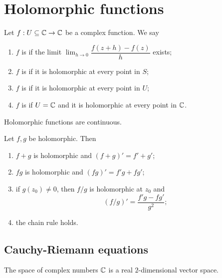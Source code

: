 \section{Holomorphic functions}
\begin{definition}
Let $f:U\subseteq \mathbb{C} \to \mathbb{C}$ be a complex function. We say
\begin{enumerate}
\item $f$ is  if the limit $\lim_{h\to 0} \dfrac{f(z+h) - f(z)}{h}$
exists;
\item $f$ is  if it is holomorphic at every point in $S$;
\item $f$ is  if it is holomorphic at every point in $U$;
\item $f$ is  if $U=\mathbb{C}$ and it is holomorphic at every point in $\mathbb{C}$.
\end{enumerate}
\end{definition}

\begin{lemma}
Holomorphic functions are continuous.
\end{lemma}
\begin{lemma}
Let $f,g$ be holomorphic. Then
\begin{enumerate}
\item $f+g$ is holomorphic and $(f+g)' = f'+g'$;
\item $fg$ is holomorphic and $(fg)' = f'g+fg'$;
\item if $g(z_0)\neq 0$, then $f/g$ is holomorphic at $z_0$ and
\[ (f/g)' = \frac{f'g - fg'}{g^2}; \]
\item the chain rule holds.
\end{enumerate}
\end{lemma}

\subsection{Cauchy-Riemann equations}
The space of complex numbers $\mathbb{C}$ is a real $2$-dimensional vector space.

